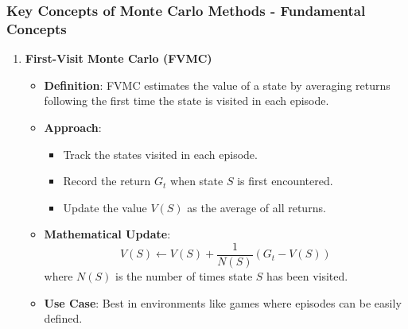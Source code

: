 \documentclass[aspectratio=169]{beamer}
\begin{document}
\begin{frame}[fragile]
    \frametitle{Key Concepts of Monte Carlo Methods - Fundamental Concepts}
    \begin{enumerate}
        \item \textbf{First-Visit Monte Carlo (FVMC)}
        \begin{itemize}
            \item \textbf{Definition}: FVMC estimates the value of a state by averaging returns following the first time the state is visited in each episode.
            \item \textbf{Approach}:
            \begin{itemize}
                \item Track the states visited in each episode.
                \item Record the return \( G_t \) when state \( S \) is first encountered.
                \item Update the value \( V(S) \) as the average of all returns.
            \end{itemize}
            \item \textbf{Mathematical Update}:
            \begin{equation}
              V(S) \leftarrow V(S) + \frac{1}{N(S)} \left( G_t - V(S) \right)
            \end{equation}
            where \( N(S) \) is the number of times state \( S \) has been visited.
            \item \textbf{Use Case}: Best in environments like games where episodes can be easily defined.
        \end{itemize}
    \end{enumerate}
\end{frame}
\end{document}
